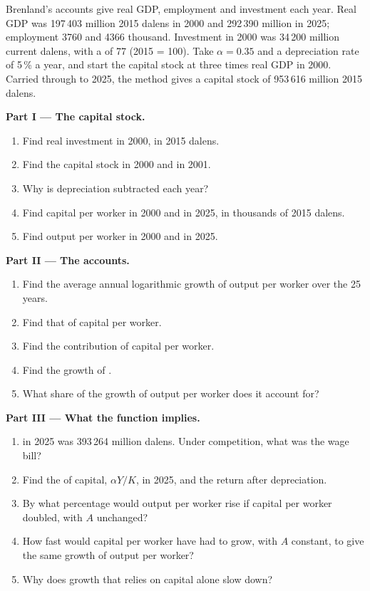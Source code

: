 \begin{problem}
\label{pb:g12:growth-and-production-function:1}
Brenland's accounts give real GDP, employment and investment each year. Real GDP was 197\,403 million 2015 dalens in 2000 and 292\,390 million in 2025; employment 3760 and
4366 thousand. Investment in 2000 was 34\,200 million current dalens, with a  of 77 (2015 = 100). Take $\alpha = 0.35$ and a depreciation rate of 5\,\% a year,
and start the capital stock at three times real GDP in 2000. Carried through to 2025, the method gives a capital stock of 953\,616 million 2015 dalens.

\medskip
\noindent\textbf{Part I --- The capital stock.}
\begin{enumerate}
\item Find real investment in 2000, in 2015 dalens.
\item Find the capital stock in 2000 and in 2001.
\item Why is depreciation subtracted each year?
\item Find capital per worker in 2000 and in 2025, in thousands of 2015 dalens.
\item Find output per worker in 2000 and in 2025.
\end{enumerate}

\medskip
\noindent\textbf{Part II --- The accounts.}
\begin{enumerate}[resume]
\item Find the average annual logarithmic growth of output per worker over the 25 years.
\item Find that of capital per worker.
\item Find the contribution of capital per worker.
\item Find the growth of .
\item What share of the growth of output per worker does it account for?
\end{enumerate}

\medskip
\noindent\textbf{Part III --- What the function implies.}
\begin{enumerate}[resume]
\item {} in 2025 was 393\,264 million dalens. Under competition, what was the wage bill?
\item Find the  of capital, $\alpha Y/K$, in 2025, and the return after depreciation.
\item By what percentage would output per worker rise if capital per worker doubled, with $A$ unchanged?
\item How fast would capital per worker have had to grow, with $A$ constant, to give the same growth of output per worker?
\item Why does growth that relies on capital alone slow down?
\end{enumerate}


\end{problem}
